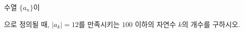 \hspace*{2mm}\begin{minipage}[t]{\dimexpr\linewidth-2mm\relax}\vspace{0pt}
수열 $\{a_n\}$이 \par\smallskip{}\par\smallskip\noindent 으로 정의될 때, $|a_k|=12$를 만족시키는 $100$ 이하의 자연수 $k$의 개수를 구하시오.\end{minipage}
